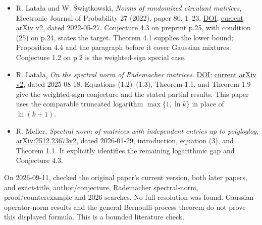\documentclass[11pt,a4paper]{article}
\providecommand{\tightlist}{\setlength{\itemsep}{0pt}\setlength{\parskip}{0pt}}
\begin{document}
\begin{itemize}
\tightlist
\item
  R. Latała and W. Świątkowski, \emph{Norms of randomized circulant
  matrices}, Electronic Journal of Probability 27 (2022), paper 80,
  1--23. \href{https://doi.org/10.1214/22-EJP799}{DOI};
  \href{https://arxiv.org/pdf/2106.03139v2}{current arXiv v2}, dated
  2022-05-27. Conjecture 4.3 on preprint p.25, with condition (25) on
  p.24, states the target. Theorem 4.1 supplies the lower bound;
  Proposition 4.4 and the paragraph before it cover Gaussian mixtures.
  Conjecture 1.2 on p.2 is the weighted-sign special case.
\item
  R. Latała, \emph{On the spectral norm of Rademacher matrices}.
  \href{https://doi.org/10.1090/tran/9637}{DOI};
  \href{https://arxiv.org/html/2405.13656v2}{current arXiv v2}, dated
  2025-08-18. Equations (1.2)--(1.3), Theorem 1.1, and Theorem 1.9 give
  the weighted-sign conjecture and the stated partial results. This
  paper uses the comparable truncated logarithm \(\max\{1,\ln k\}\) in
  place of \(\ln(k+1)\).
\item
  R. Meller, \emph{Spectral norm of matrices with independent entries up
  to polyloglog},
  \href{https://arxiv.org/html/2512.23673v2}{arXiv:2512.23673v2}, dated
  2026-01-29, introduction, equation (3), and Theorem 1.1. It explicitly
  identifies the remaining logarithmic gap and Conjecture 4.3.
\end{itemize}

On 2026-09-11, checked the original paper's current version, both later
papers, and exact-title, author/conjecture, Rademacher spectral-norm,
proof/counterexample and 2026 searches. No full resolution was found.
Gaussian operator-norm results and the general Bernoulli-process theorem
do not prove this displayed formula. This is a bounded literature check.
\end{document}

